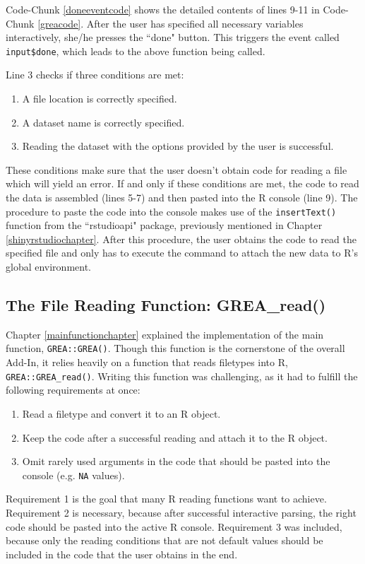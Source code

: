 \documentclass[12pt]{article} %
\newcommand{\li}{\lstinline}
\begin{document}
Code-Chunk \ref{doneeventcode} shows the detailed contents of lines 9-11 in Code-Chunk \ref{greacode}. After the user has specified all necessary variables interactively, she/he presses the ``done" button. This triggers the event called \li{input$done}, which leads to the above function being called.

Line 3 checks if three conditions are met: 
\begin{enumerate}
\item A file location is correctly specified.
\item A dataset name is correctly specified.
\item Reading the dataset with the options provided by the user is successful.
\end{enumerate}

These conditions make sure that the user doesn't obtain code for reading a file which will yield an error. If and only if these conditions are met, the code to read the data is assembled (lines 5-7)  and then pasted into the R console (line 9). The procedure to paste the code into the console makes use of the \li{insertText()} function from the ``rstudioapi" package, previously mentioned in Chapter \ref{shinyrstudiochapter}. After this procedure, the user obtains the code to read the specified file and only has to execute the command to attach the new data to R's global environment.

\subsection{The File Reading Function: \textrm{GREA\_read()}}
Chapter \ref{mainfunctionchapter} explained the implementation of the main function, \li{GREA::GREA()}. Though this function is the cornerstone of the overall Add-In, it relies heavily on a function that reads filetypes into R, \li{GREA::GREA_read()}. Writing this function was challenging, as it had to fulfill the following requirements at once:

\begin{enumerate}
\item Read a filetype and convert it to an R object.
\item Keep the code after a successful reading and attach it to the R object.
\item Omit rarely used arguments in the code that should be pasted into the console (e.g. \li{NA} values).
\end{enumerate}

Requirement 1 is the goal that many R reading functions want to achieve. Requirement 2 is necessary, because after successful interactive parsing, the right code should be pasted into the active R console. Requirement 3 was included, because only the reading conditions that are not default values should be included in the code that the user obtains in the end.
\end{document}

